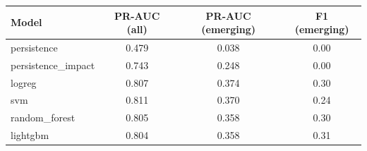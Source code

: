 \begin{tabular}{lccc}
\toprule
Model & PR-AUC (all) & PR-AUC (emerging) & F1 (emerging) \\
\midrule
persistence & 0.479 & 0.038 & 0.00 \\
persistence\_impact & 0.743 & 0.248 & 0.00 \\
logreg & 0.807 & 0.374 & 0.30 \\
svm & 0.811 & 0.370 & 0.24 \\
random\_forest & 0.805 & 0.358 & 0.30 \\
lightgbm & 0.804 & 0.358 & 0.31 \\
\bottomrule
\end{tabular}
